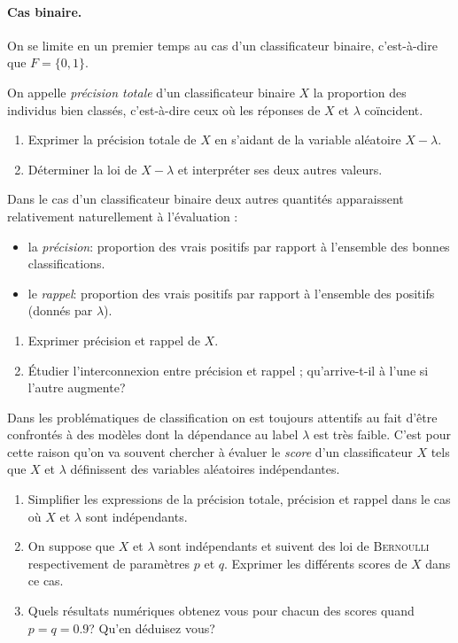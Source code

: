 \documentclass[11pt, a4paper]{article}
\begin{document}
\paragraph{Cas binaire.} On se limite en un premier temps au cas d'un
classificateur binaire, c'est-à-dire que $F = \{0, 1\}$.
\begin{question}
  On appelle \emph{précision totale} d'un classificateur binaire $X$
  la proportion des individus bien classés, c'est-à-dire ceux où les
  réponses de $X$ et $\lambda$ coïncident.
  \begin{enumerate}
  \item Exprimer la précision totale de $X$ en s'aidant de la variable
    aléatoire $X - \lambda$.
  \item Déterminer la loi de $X-\lambda$ et interpréter ses deux
    autres valeurs.
  \end{enumerate}
\end{question}
Dans le cas d'un classificateur binaire deux autres quantités
apparaissent relativement naturellement à l'évaluation :
\begin{itemize}
\item la \emph{précision}: proportion des vrais positifs par
  rapport à l'ensemble des bonnes classifications.
\item le \emph{rappel}: proportion des vrais positifs par rapport
  à l'ensemble des positifs (donnés par $\lambda$).
\end{itemize}
\begin{question}
  \begin{enumerate}
  \item Exprimer précision et rappel de $X$.
  \item Étudier l'interconnexion entre précision et rappel ;
    qu'arrive-t-il à l'une si l'autre augmente?
  \end{enumerate}
\end{question}
Dans les problématiques de classification on est toujours attentifs au
fait d'être confrontés à des modèles dont la dépendance au label
$\lambda$ est très faible. C'est pour cette raison qu'on va souvent
chercher à évaluer le \emph{score} d'un classificateur $X$ tels que
$X$ et $\lambda$ définissent des variables aléatoires indépendantes.
\begin{question}
  \begin{enumerate}
  \item Simplifier les expressions de la précision totale, précision
    et rappel dans le cas où $X$ et $\lambda$ sont indépendants.
  \item On suppose que $X$ et $\lambda$ sont indépendants et suivent
    des loi de \textsc{Bernoulli} respectivement de paramètres $p$ et
    $q$. Exprimer les différents scores de $X$ dans ce cas.
  \item Quels résultats numériques obtenez vous pour chacun des scores
    quand $p=q=0.9$? Qu'en déduisez vous?
  \end{enumerate}
\end{question}
\end{document}
